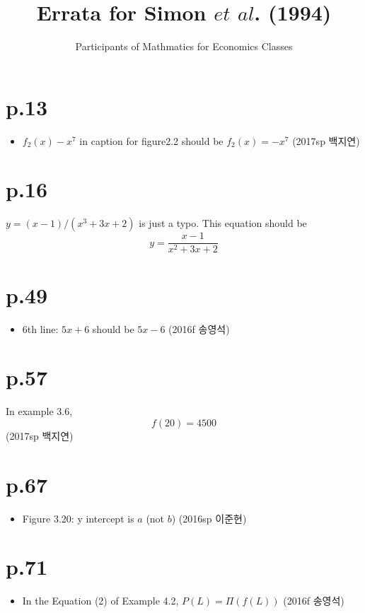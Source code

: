 \documentclass[a4paper]{article}
\title{Errata for Simon $et$ $al$. (1994)}
\author{Participants of Mathmatics for Economics Classes}
\begin{document}
\maketitle

\section{p.13} %
\label{sec:p_13}
\begin{itemize}
	\item $f_2(x) - x^7$ in caption for figure2.2 should be $f_2(x)=-x^7$ (2017sp 백지연)
\end{itemize}

\section{p.16} %
\label{sec:p_16}
$y=(x-1)/(x^3+3x+2)$ is just a typo. This equation should be
\[
	y=\frac{x-1}{x^2+3x+2}
\]

\section{p.49} %
\label{sec:p49}
\begin{itemize}
	\item 6th line: $5x+6$ should be $5x-6$ (2016f 송영석)
\end{itemize}

\section{p.57} %
\label{sec:p_57}
In example 3.6, 
\[
	f(20) = 4500
\]
(2017sp 백지연)

\section{p.67} %
\label{sec:p67}
\begin{itemize}
	\item Figure 3.20: y intercept is $a$ (not $b$) (2016sp 이준현)
\end{itemize}

\section{p.71} %
\label{sec:p_71}
\begin{itemize}
	\item In the Equation (2) of Example 4.2, $P(L) = \Pi(f(L))$ (2016f 송영석)
\end{itemize}
\end{document}
